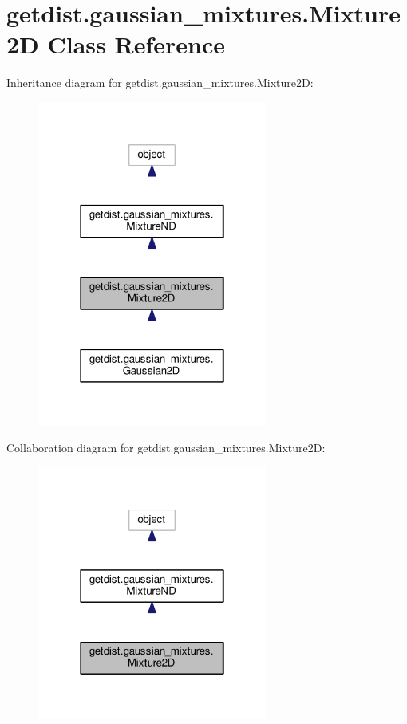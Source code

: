 \hypertarget{classgetdist_1_1gaussian__mixtures_1_1Mixture2D}{}\section{getdist.\+gaussian\+\_\+mixtures.\+Mixture2D Class Reference}
\label{classgetdist_1_1gaussian__mixtures_1_1Mixture2D}


Inheritance diagram for getdist.\+gaussian\+\_\+mixtures.\+Mixture2D\+:
\nopagebreak
\begin{figure}[H]
\begin{center}
\leavevmode
\includegraphics[width=214pt]{classgetdist_1_1gaussian__mixtures_1_1Mixture2D__inherit__graph}
\end{center}
\end{figure}


Collaboration diagram for getdist.\+gaussian\+\_\+mixtures.\+Mixture2D\+:
\nopagebreak
\begin{figure}[H]
\begin{center}
\leavevmode
\includegraphics[width=214pt]{classgetdist_1_1gaussian__mixtures_1_1Mixture2D__coll__graph}
\end{center}
\end{figure}
